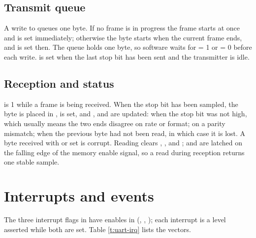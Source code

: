 \subsection{Transmit queue}

A write to  queues one byte. If no frame is in progress the frame starts at once and  is set immediately; otherwise the byte starts when the current frame ends, and  is set then. The queue holds one byte, so software waits for  = 1 or  = 0 before each write.  is set when the last stop bit has been sent and the transmitter is idle.

\subsection{Reception and status}

 is 1 while a frame is being received. When the stop bit has been sampled, the byte is placed in ,  is set, and ,  and  are updated:  when the stop bit was not high, which usually means the two ends disagree on rate or format;  on a parity mismatch;  when the previous byte had not been read, in which case it is lost. A byte received with  or  set is corrupt. Reading  clears , ,  and ;  and  are latched on the falling edge of the memory enable signal, so a read during reception returns one stable sample.

\section{Interrupts and events}

The three interrupt flags in  have enables in  (, , ); each interrupt is a level asserted while both are set. Table \ref{t:uart-irq} lists the vectors.


